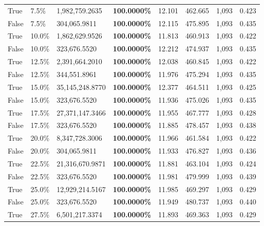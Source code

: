 \begin{table}[H]
\begin{tabular}{lllrllll}
\cline{1-8}
True & 7.5\% & 1,982,759.2635 & \bfseries \color{red} 100.0000\% & 12.101 & 462.665 & 1,093 & 0.423 \\
\cline{1-8}
False & 7.5\% & 304,065.9811 & \bfseries \color{red} 100.0000\% & 12.115 & 475.895 & 1,093 & 0.435 \\
\cline{1-8}
True & 10.0\% & 1,862,629.9526 & \bfseries \color{red} 100.0000\% & 11.813 & 460.913 & 1,093 & 0.422 \\
\cline{1-8}
False & 10.0\% & 323,676.5520 & \bfseries \color{red} 100.0000\% & 12.212 & 474.937 & 1,093 & 0.435 \\
\cline{1-8}
True & 12.5\% & 2,391,664.2010 & \bfseries \color{red} 100.0000\% & 12.038 & 460.845 & 1,093 & 0.422 \\
\cline{1-8}
False & 12.5\% & 344,551.8961 & \bfseries \color{red} 100.0000\% & 11.976 & 475.294 & 1,093 & 0.435 \\
\cline{1-8}
True & 15.0\% & 35,145,248.8770 & \bfseries \color{red} 100.0000\% & 12.377 & 464.511 & 1,093 & 0.425 \\
\cline{1-8}
False & 15.0\% & 323,676.5520 & \bfseries \color{red} 100.0000\% & 11.936 & 475.026 & 1,093 & 0.435 \\
\cline{1-8}
True & 17.5\% & 27,371,147.3466 & \bfseries \color{red} 100.0000\% & 11.955 & 467.777 & 1,093 & 0.428 \\
\cline{1-8}
False & 17.5\% & 323,676.5520 & \bfseries \color{red} 100.0000\% & 11.885 & 478.457 & 1,093 & 0.438 \\
\cline{1-8}
True & 20.0\% & 8,347,728.3006 & \bfseries \color{red} 100.0000\% & 11.966 & 461.584 & 1,093 & 0.422 \\
\cline{1-8}
False & 20.0\% & 304,065.9811 & \bfseries \color{red} 100.0000\% & 11.933 & 476.827 & 1,093 & 0.436 \\
\cline{1-8}
True & 22.5\% & 21,316,670.9871 & \bfseries \color{red} 100.0000\% & 11.881 & 463.104 & 1,093 & 0.424 \\
\cline{1-8}
False & 22.5\% & 323,676.5520 & \bfseries \color{red} 100.0000\% & 11.981 & 479.999 & 1,093 & 0.439 \\
\cline{1-8}
True & 25.0\% & 12,929,214.5167 & \bfseries \color{red} 100.0000\% & 11.985 & 469.297 & 1,093 & 0.429 \\
\cline{1-8}
False & 25.0\% & 323,676.5520 & \bfseries \color{red} 100.0000\% & 11.949 & 480.737 & 1,093 & 0.440 \\
\cline{1-8}
True & 27.5\% & 6,501,217.3374 & \bfseries \color{red} 100.0000\% & 11.893 & 469.363 & 1,093 & 0.429 \\

\end{tabular}
\end{table}
